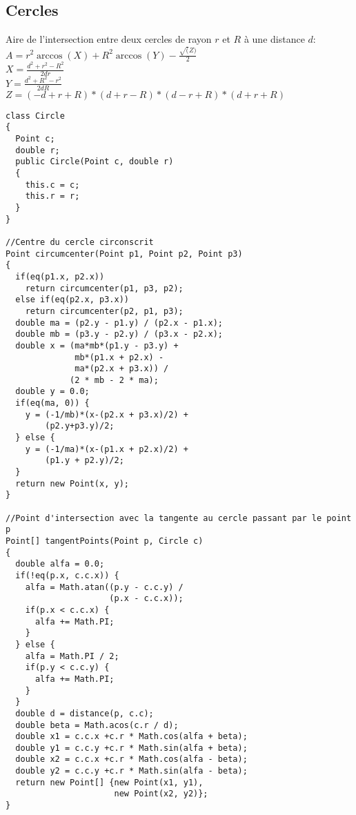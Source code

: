 \subsection{Cercles}
Aire de l'intersection entre deux cercles de rayon $r$ et $R$ à une distance $d$:
$A = r^2\arccos(X) + R^2 \arccos(Y) - \frac{\sqrt(Z)}{2}$\\
$X = \frac{d^2+r^2-R^2}{2dr}$\\
$Y = \frac{d^2+R^2-r^2}{2dR}$\\
$Z = (-d+r+R)*(d+r-R)*(d-r+R)*(d+r+R)$
\begin{lstlisting}
class Circle
{
  Point c;
  double r;
  public Circle(Point c, double r)
  {
    this.c = c;
    this.r = r;
  }
}

//Centre du cercle circonscrit
Point circumcenter(Point p1, Point p2, Point p3)
{
  if(eq(p1.x, p2.x))
    return circumcenter(p1, p3, p2);
  else if(eq(p2.x, p3.x))
    return circumcenter(p2, p1, p3);
  double ma = (p2.y - p1.y) / (p2.x - p1.x);
  double mb = (p3.y - p2.y) / (p3.x - p2.x);
  double x = (ma*mb*(p1.y - p3.y) + 
              mb*(p1.x + p2.x) - 
              ma*(p2.x + p3.x)) / 
             (2 * mb - 2 * ma);
  double y = 0.0;
  if(eq(ma, 0)) {
    y = (-1/mb)*(x-(p2.x + p3.x)/2) +  
        (p2.y+p3.y)/2; 	
  } else {
    y = (-1/ma)*(x-(p1.x + p2.x)/2) + 
        (p1.y + p2.y)/2; 	
  }
  return new Point(x, y);
}

//Point d'intersection avec la tangente au cercle passant par le point p
Point[] tangentPoints(Point p, Circle c)
{
  double alfa = 0.0;
  if(!eq(p.x, c.c.x)) {
    alfa = Math.atan((p.y - c.c.y) / 
                     (p.x - c.c.x));
    if(p.x < c.c.x) {
      alfa += Math.PI;
    }
  } else {
    alfa = Math.PI / 2;
    if(p.y < c.c.y) {
      alfa += Math.PI;
    }
  }
  double d = distance(p, c.c);
  double beta = Math.acos(c.r / d);	    
  double x1 = c.c.x +c.r * Math.cos(alfa + beta);  
  double y1 = c.c.y +c.r * Math.sin(alfa + beta);
  double x2 = c.c.x +c.r * Math.cos(alfa - beta);  
  double y2 = c.c.y +c.r * Math.sin(alfa - beta);  
  return new Point[] {new Point(x1, y1), 
                      new Point(x2, y2)};
}
\end{lstlisting}
